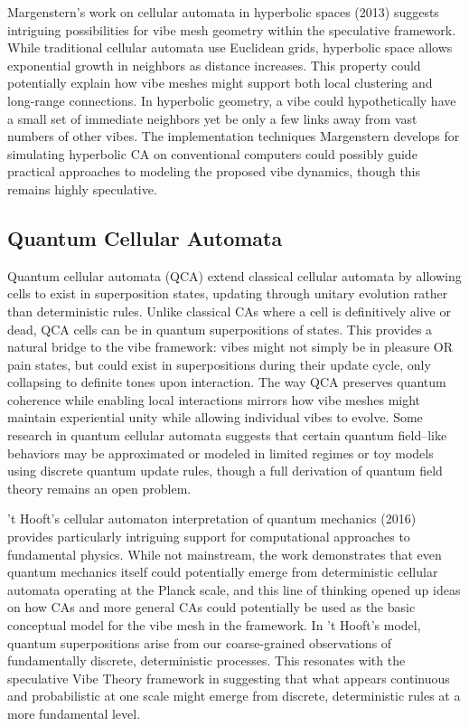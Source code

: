 Margenstern's work on cellular automata in hyperbolic spaces (2013) suggests intriguing possibilities for vibe mesh geometry within the speculative framework. While traditional cellular automata use Euclidean grids, hyperbolic space allows exponential growth in neighbors as distance increases. This property could potentially explain how vibe meshes might support both local clustering and long-range connections. In hyperbolic geometry, a vibe could hypothetically have a small set of immediate neighbors yet be only a few links away from vast numbers of other vibes. The implementation techniques Margenstern develops for simulating hyperbolic CA on conventional computers could possibly guide practical approaches to modeling the proposed vibe dynamics, though this remains highly speculative.

\subsection{Quantum Cellular Automata}

Quantum cellular automata (QCA) extend classical cellular automata by allowing cells to exist in superposition states, updating through unitary evolution rather than deterministic rules. Unlike classical CAs where a cell is definitively alive or dead, QCA cells can be in quantum superpositions of states. This provides a natural bridge to the vibe framework: vibes might not simply be in pleasure OR pain states, but could exist in superpositions during their update cycle, only collapsing to definite tones upon interaction. The way QCA preserves quantum coherence while enabling local interactions mirrors how vibe meshes might maintain experiential unity while allowing individual vibes to evolve. Some research in quantum cellular automata suggests that certain quantum field–like behaviors may be approximated or modeled in limited regimes or toy models using discrete quantum update rules, though a full derivation of quantum field theory remains an open problem.

't Hooft's cellular automaton interpretation of quantum mechanics (2016) provides particularly intriguing support for computational approaches to fundamental physics. While not mainstream, the work demonstrates that even quantum mechanics itself could potentially emerge from deterministic cellular automata operating at the Planck scale, and this line of thinking opened up ideas on how CAs and more general CAs could potentially be used as the basic conceptual model for the vibe mesh in the framework. In 't Hooft's model, quantum superpositions arise from our coarse-grained observations of fundamentally discrete, deterministic processes. This resonates with the speculative Vibe Theory framework in suggesting that what appears continuous and probabilistic at one scale might emerge from discrete, deterministic rules at a more fundamental level.


